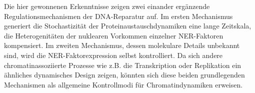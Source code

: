 Die hier gewonnenen Erkenntnisse zeigen zwei einander erg\"{a}nzende Regulationsmechanismen der DNA-Reparatur auf. Im ersten Mechanismus generiert die Stochastizit\"{a}t der Proteinaustauschdynamiken eine lange Zeitskala, die Heterogenit\"{a}ten der nu\-klearen Vorkommen einzelner NER-Faktoren kompensiert. Im zweiten Mechanismus, dessen molekulare Details unbekannt sind, wird die NER-Faktorexpression selbst kontrolliert. Da sich andere chromatinassoziierte Prozesse wie z.B. die Transkription oder Replikation ein \"{a}hnliches dynamisches Design zeigen, k\"{o}nnten sich diese beiden grundlegenden Mechanismen als allgemeine Kontrollmodi f\"{u}r Chromatindynamiken erweisen.  


  




